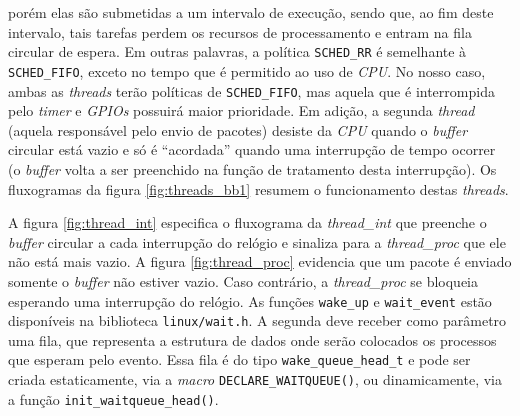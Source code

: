 porém elas são submetidas a um intervalo de execução, sendo que, ao fim deste
intervalo, tais tarefas perdem os recursos de processamento e entram na fila
circular de espera. Em outras palavras, a política \texttt{SCHED\_RR} é
semelhante à \texttt{SCHED\_FIFO}, exceto no tempo que é permitido ao uso de
\textit{CPU}. No nosso caso, ambas as \textit{threads} terão políticas de
\texttt{SCHED\_FIFO}, mas aquela que é interrompida pelo \textit{timer} e
\textit{GPIOs} possuirá maior prioridade. Em adição, a segunda \textit{thread}
(aquela responsável pelo envio de pacotes) desiste da \textit{CPU} quando o
\textit{buffer} circular está vazio e só é ``acordada'' quando uma interrupção
de tempo ocorrer (o \textit{buffer} volta a ser preenchido na função de
tratamento desta interrupção). Os fluxogramas da figura \ref{fig:threads_bb1}
resumem o funcionamento destas \textit{threads}.

\vspace{12pt}

A figura \ref{fig:thread_int} especifica o fluxograma da \textit{thread\_int}
que preenche o \textit{buffer} circular a cada interrupção do relógio e sinaliza
para a \textit{thread\_proc} que ele não está mais vazio. A figura
\ref{fig:thread_proc} evidencia que um pacote é enviado somente o
\textit{buffer} não estiver vazio. Caso contrário, a \textit{thread\_proc}
se bloqueia esperando uma interrupção do relógio. As funções \texttt{wake\_up} e
\texttt{wait\_event} estão disponíveis na biblioteca \texttt{linux/wait.h}. A
segunda deve receber como parâmetro uma fila, que representa a estrutura de
dados onde serão colocados os processos que esperam pelo evento. Essa fila é do
tipo \texttt{wake\_queue\_head\_t} e pode ser criada estaticamente, via
a \textit{macro} \texttt{DECLARE\_WAITQUEUE()}, ou dinamicamente, via a função
\texttt{init\_waitqueue\_head()}.


